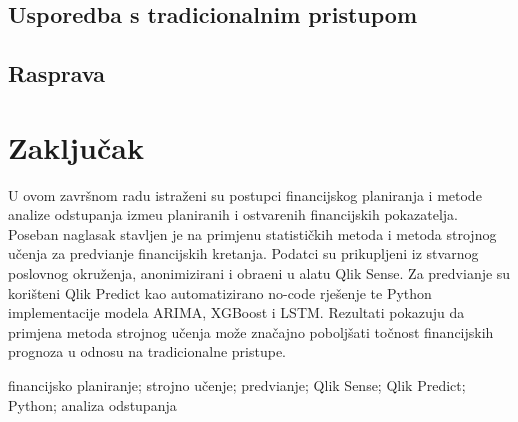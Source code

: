 \documentclass[zavrsnirad]{fer}
\begin{document}
\section{Usporedba s tradicionalnim pristupom}
\label{sec:usporedba}


\section{Rasprava}
\label{sec:rasprava}



\chapter{Zaklju\v{c}ak}
\label{pog:zakljucak}







\begin{sazetak}
  U ovom zavr\v{s}nom radu istra\v{z}eni su postupci financijskog planiranja i metode analize odstupanja izme\dj u planiranih i ostvarenih financijskih pokazatelja. Poseban naglasak stavljen je na primjenu statisti\v{c}kih metoda i metoda strojnog u\v{c}enja za predvi\dj anje financijskih kretanja. Podatci su prikupljeni iz stvarnog poslovnog okru\v{z}enja, anonimizirani i obra\dj eni u alatu Qlik Sense. Za predvi\dj anje su kori\v{s}teni Qlik Predict kao automatizirano no-code rje\v{s}enje te Python implementacije modela ARIMA, XGBoost i LSTM. Rezultati pokazuju da primjena metoda strojnog u\v{c}enja mo\v{z}e zna\v{c}ajno pobolj\v{s}ati to\v{c}nost financijskih prognoza u odnosu na tradicionalne pristupe.
\end{sazetak}

\begin{kljucnerijeci}
  financijsko planiranje; strojno u\v{c}enje; predvi\dj anje; Qlik Sense; Qlik Predict; Python; analiza odstupanja
\end{kljucnerijeci}
\end{document}
